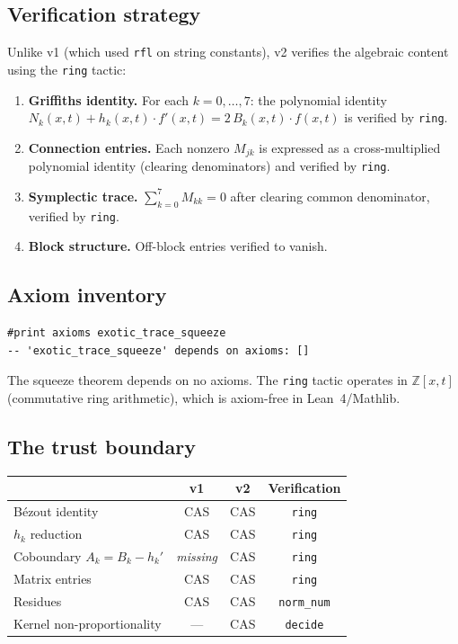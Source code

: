 \documentclass[11pt]{article}
\theoremstyle{plain}
\theoremstyle{definition}
\theoremstyle{remark}
\newcommand{\Z}{\mathbb{Z}}
\begin{document}
\subsection{Verification strategy}

Unlike v1 (which used \texttt{rfl} on string constants), v2 verifies
the algebraic content using the \texttt{ring} tactic:

\begin{enumerate}[nosep]
\item \textbf{Griffiths identity.} For each $k = 0,\ldots,7$: the
  polynomial identity $N_k(x,t) + h_k(x,t) \cdot f'(x,t) =
  2\, B_k(x,t) \cdot f(x,t)$ is verified by \texttt{ring}.
\item \textbf{Connection entries.} Each nonzero $M_{jk}$ is expressed
  as a cross-multiplied polynomial identity (clearing denominators)
  and verified by \texttt{ring}.
\item \textbf{Symplectic trace.} $\sum_{k=0}^{7} M_{kk} = 0$
  after clearing common denominator, verified by \texttt{ring}.
\item \textbf{Block structure.} Off-block entries verified to vanish.
\end{enumerate}

\subsection{Axiom inventory}

\begin{lstlisting}[style=leanstyle,caption={Expected axiom output}]
#print axioms exotic_trace_squeeze
-- 'exotic_trace_squeeze' depends on axioms: []
\end{lstlisting}

The squeeze theorem depends on no axioms. The \texttt{ring} tactic
operates in $\Z[x,t]$ (commutative ring arithmetic), which is
axiom-free in Lean~4/Mathlib.

\subsection{The trust boundary}

\begin{center}
\begin{tabular}{lccc}
\toprule
& \textbf{v1} & \textbf{v2} & \textbf{Verification} \\
\midrule
B\'ezout identity & CAS & CAS & \texttt{ring} \\
$h_k$ reduction & CAS & CAS & \texttt{ring} \\
Coboundary $A_k = B_k - h_k'$ & \emph{missing} & CAS & \texttt{ring} \\
Matrix entries & CAS & CAS & \texttt{ring} \\
Residues & CAS & CAS & \texttt{norm\_num} \\
Kernel non-proportionality & --- & CAS & \texttt{decide} \\
\bottomrule
\end{tabular}
\end{center}
\end{document}
